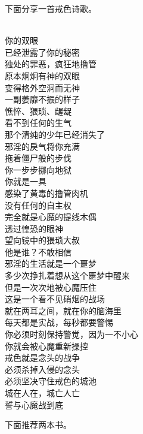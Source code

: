 下面分享一首戒色诗歌。

\begin{poem}[戒色的城池]
    \begin{multicols}{2}
        \begin{center}~\\
            你的双眼 \\ 已经泄露了你的秘密 \\ 独处的罪恶，疯狂地撸管 \\ 原本炯炯有神的双眼 \\ 变得格外空洞而无神 \\ 一副萎靡不振的样子 \\ 憔悴、猥琐、龌龊 \\ 看不到任何的生气 \\ 那个清纯的少年已经消失了 \\ 邪淫的戾气将你充满 \\ 拖着僵尸般的步伐 \\ 你一步步挪向地狱 \\ 你就是一具 \\ 感染了黄毒的撸管肉机 \\ 没有任何的自主权 \\ 完全就是心魔的提线木偶 \\ 透过惶恐的眼神 \\ 望向镜中的猥琐大叔 \\ 他是谁？不敢相信 \\ 邪淫的生活就是一个噩梦 \\ 多少次挣扎着想从这个噩梦中醒来 \\ 但是一次次地被心魔压住 \\ 这是一个看不见硝烟的战场 \\ 就在两耳之间，就在你的脑海里 \\ 每天都是实战，每秒都要警惕 \\ 你必须时刻保持警觉，因为一不小心 \\ 你就会被心魔重新操控 \\ 戒色就是念头的战争 \\ 必须杀掉入侵的念头 \\ 必须坚决守住戒色的城池 \\ 城在人在，城亡人亡 \\ 誓与心魔战到底
        \end{center}
    \end{multicols}
\end{poem}

下面推荐两本书。

